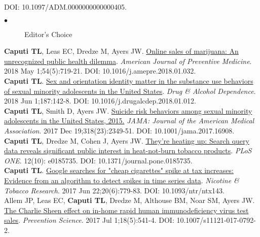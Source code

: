 \documentclass[10pt, letterpaper]{article}
\newcommand{\years}[1]{\marginnote{\normalsize #1}}
\begin{document}
DOI: 10.1097/ADM.0000000000000405.
    \begin{description}
    \item[$\bullet$] Editor's Choice
    \end{description}
\years{2018}\textbf{Caputi TL}, Leas EC, Dredze M, Ayers JW.
\href{http://dx.doi.org/10.1016/j.amepre.2018.01.032}{Online sales of marijuana: An unrecognized public health dilemma}. \textit{American Journal of Preventive Medicine}. 2018 May 1;54(5):719-21. DOI: 10.1016/j.amepre.2018.01.032.\\[.2cm]
\years{2018}\textbf{Caputi TL}. \href{https://doi.org/10.1016/j.drugalcdep.2018.01.012
}{Sex and orientation identity matter in the substance use behaviors of sexual minority adolescents in the United States}. \emph{Drug \& Alcohol Dependence}. 2018 Jun 1;187:142-8. DOI: 10.1016/j.drugalcdep.2018.01.012.
\\[.2cm]
\years{2017}\textbf{Caputi TL}, Smith D, Ayers JW.
\href{http://dx.doi.org/10.1001/jama.2017.16908}{Suicide risk behaviors among sexual minority adolescents in the United States, 2015.} \emph{JAMA: Journal of the American Medical Association}.  2017 Dec 19;318(23):2349-51. DOI: 10.1001/jama.2017.16908.\\[.2cm]
\years{2017}\textbf{Caputi TL}, Dredze M, Cohen J, Ayers JW.
\href{http://dx.doi.org/10.1371/journal.pone.0185735}{They’re heating up: Search query data reveals significant public interest in heat-not-burn tobacco products}. \emph{PLoS ONE}. 12(10): e0185735. DOI: 10.1371/journal.pone.0185735.\\[.2cm]
\years{2017}\textbf{Caputi TL}.  \href{http://dx.doi.org/10.1093/ntr/ntx143}{Google searches for "cheap cigarettes" spike at tax increases: Evidence from an algorithm to detect spikes in time series data}. \emph{Nicotine \& Tobacco Research}. 2017 Jun 22;20(6):779-83. DOI: 10.1093/ntr/ntx143.\\[.2cm]
\years{2017}Allem JP, Leas EC, \textbf{Caputi TL}, Dredze M, Althouse BM, Noar SM, Ayers JW. \href{http://dx.doi.org/10.1007/s11121-017-0792-2}{The Charlie Sheen effect on in-home rapid human immunodeficiency virus test sales}. \textit{Prevention Science}. 2017 Jul 1;18(5):541-4. DOI:  10.1007/s11121-017-0792-2.\\[.2cm]

\end{document}

